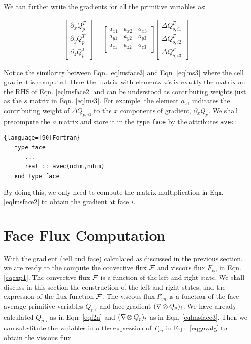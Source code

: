 \documentclass[12pt, letterpaper]{report}
\begin{document}
We can further write the gradients for all the primitive variables as:

\begin{align}\label{eqlmsface3}
   \begin{bmatrix}\partial_x Q_p^T \\ \partial_y Q_p^T \\ \partial_z Q_p^T\end{bmatrix} = 
      \begin{bmatrix}
         a_{x1} & a_{x2} & a_{x3} \\
         a_{y1} & a_{y2} & a_{y3} \\
         a_{z1} & a_{z2} & a_{z3} \\
         \end{bmatrix} \begin{bmatrix}\Delta Q_{p,i1}^T \\\Delta Q_{p,i2}^T \\\Delta Q_{p,i3}^T\end{bmatrix}
\end{align}

Notice the similarity between Eqn. \ref{eqlmsface3} and Eqn. \ref{eqlms3} where the cell gradient
is computed. Here the matrix with elements $a$'s is exactly the matrix on the RHS of Eqn.
\ref{eqlmsface2} and can be understood as contributing weights just as the $s$ matrix in Eqn.
\ref{eqlms3}. For example, the element $a_{x1}$ indicates the contributing weight of $\Delta
Q_{p,i1}$ to the $x$ components of gradient, $\partial_x Q_p$. We shall precompute the $a$ matrix
and store it in the type \verb+face+ by the attributes \verb+avec+:

\begin{lstlisting}{language=[90]Fortran}
   type face
      ...
      real :: avec(ndim,ndim)
   end type face
\end{lstlisting}

By doing this, we only need to compute the matrix multiplication in Eqn. \ref{eqlmsface2} to obtain
the gradient at face $i$.

\clearpage
\section{Face Flux Computation}

With the gradient (cell and face) calculated as discussed in the previous section, we are ready to
the compute the convective flux $\mathcal{F}$ and viscous flux $F_{vn}$ in Eqn. \ref{eqexp1}. The convective
flux $\mathcal{F}$ is a function of the left and right state. We shall discuss in this section the
construction of the left and right states, and the expression of the flux function $\mathcal{F}$.  The
viscous flux $F_{vn}$ is a function of the face average primitive variables $Q_{p,i}$ and face
gradient $(\nabla \mathop{\otimes} Q_p)_i$. We have already calculated $Q_{p,i}$ as in Eqn. \ref{eqf2n} and
$(\nabla \mathop{\otimes} Q_p)_i$ as in Eqn. \ref{eqlmsface3}. Then we can substitute the variables into the
expression of $F_{vn}$ in Eqn. \ref{eqgovalg} to obtain the viscous flux.
\end{document}
